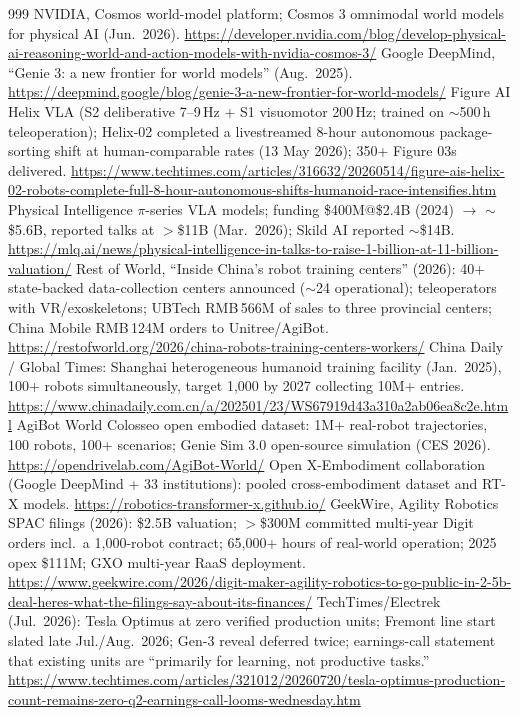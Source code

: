 \begin{thebibliography}{999}
 NVIDIA, Cosmos world-model platform; Cosmos 3 omnimodal world models for physical AI (Jun.\ 2026). \url{https://developer.nvidia.com/blog/develop-physical-ai-reasoning-world-and-action-models-with-nvidia-cosmos-3/}
 Google DeepMind, ``Genie 3: a new frontier for world models'' (Aug.\ 2025). \url{https://deepmind.google/blog/genie-3-a-new-frontier-for-world-models/}
 Figure AI Helix VLA (S2 deliberative 7--9\,Hz + S1 visuomotor 200\,Hz; trained on $\sim$500\,h teleoperation); Helix-02 completed a livestreamed 8-hour autonomous package-sorting shift at human-comparable rates (13 May 2026); 350+ Figure 03s delivered. \url{https://www.techtimes.com/articles/316632/20260514/figure-ais-helix-02-robots-complete-full-8-hour-autonomous-shifts-humanoid-race-intensifies.htm}
 Physical Intelligence $\pi$-series VLA models; funding \$400M@\$2.4B (2024) $\to$ $\sim$\$5.6B, reported talks at $>$\$11B (Mar.\ 2026); Skild AI reported $\sim$\$14B. \url{https://mlq.ai/news/physical-intelligence-in-talks-to-raise-1-billion-at-11-billion-valuation/}
 Rest of World, ``Inside China's robot training centers'' (2026): 40+ state-backed data-collection centers announced ($\sim$24 operational); teleoperators with VR/exoskeletons; UBTech RMB\,566M of sales to three provincial centers; China Mobile RMB\,124M orders to Unitree/AgiBot. \url{https://restofworld.org/2026/china-robots-training-centers-workers/}
 China Daily / Global Times: Shanghai heterogeneous humanoid training facility (Jan.\ 2025), 100+ robots simultaneously, target 1,000 by 2027 collecting 10M+ entries. \url{https://www.chinadaily.com.cn/a/202501/23/WS67919d43a310a2ab06ea8c2e.html}
 AgiBot World Colosseo open embodied dataset: 1M+ real-robot trajectories, 100 robots, 100+ scenarios; Genie Sim 3.0 open-source simulation (CES 2026). \url{https://opendrivelab.com/AgiBot-World/}
 Open X-Embodiment collaboration (Google DeepMind + 33 institutions): pooled cross-embodiment dataset and RT-X models. \url{https://robotics-transformer-x.github.io/}
 GeekWire, Agility Robotics SPAC filings (2026): \$2.5B valuation; $>$\$300M committed multi-year Digit orders incl.\ a 1,000-robot contract; 65,000+ hours of real-world operation; 2025 opex \$111M; GXO multi-year RaaS deployment. \url{https://www.geekwire.com/2026/digit-maker-agility-robotics-to-go-public-in-2-5b-deal-heres-what-the-filings-say-about-its-finances/}
 TechTimes/Electrek (Jul.\ 2026): Tesla Optimus at zero verified production units; Fremont line start slated late Jul./Aug.\ 2026; Gen-3 reveal deferred twice; earnings-call statement that existing units are ``primarily for learning, not productive tasks.'' \url{https://www.techtimes.com/articles/321012/20260720/tesla-optimus-production-count-remains-zero-q2-earnings-call-looms-wednesday.htm}

\end{thebibliography}
